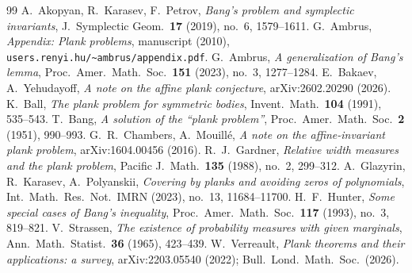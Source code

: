 \documentclass[11pt]{article}
\theoremstyle{plain}
\theoremstyle{remark}
\begin{document}
\begin{thebibliography}{99}
 A.~Akopyan, R.~Karasev, F.~Petrov,
\emph{Bang's problem and symplectic invariants},
J.\ Symplectic Geom.\ \textbf{17} (2019), no.~6, 1579--1611.
 G.~Ambrus, \emph{Appendix: Plank problems}, manuscript (2010),
\texttt{users.renyi.hu/\textasciitilde ambrus/appendix.pdf}.
 G.~Ambrus, \emph{A generalization of Bang's lemma},
Proc.\ Amer.\ Math.\ Soc.\ \textbf{151} (2023), no.~3, 1277--1284.
 E.~Bakaev, A.~Yehudayoff, \emph{A note on the affine plank
conjecture}, arXiv:2602.20290 (2026).
 K.~Ball, \emph{The plank problem for symmetric bodies},
Invent.\ Math.\ \textbf{104} (1991), 535--543.
 T.~Bang, \emph{A solution of the ``plank problem''},
Proc.\ Amer.\ Math.\ Soc.\ \textbf{2} (1951), 990--993.
 G.~R.~Chambers, A.~Mouill\'e, \emph{A note on the
affine-invariant plank problem}, arXiv:1604.00456 (2016).
 R.~J.~Gardner, \emph{Relative width measures and the plank
problem}, Pacific J.\ Math.\ \textbf{135} (1988), no.~2, 299--312.
 A.~Glazyrin, R.~Karasev, A.~Polyanskii, \emph{Covering by planks
and avoiding zeros of polynomials}, Int.\ Math.\ Res.\ Not.\ IMRN (2023),
no.~13, 11684--11700.
 H.~F.~Hunter, \emph{Some special cases of Bang's inequality},
Proc.\ Amer.\ Math.\ Soc.\ \textbf{117} (1993), no.~3, 819--821.
 V.~Strassen, \emph{The existence of probability measures with
given marginals}, Ann.\ Math.\ Statist.\ \textbf{36} (1965), 423--439.
 W.~Verreault, \emph{Plank theorems and their applications:
a survey}, arXiv:2203.05540 (2022); Bull.\ Lond.\ Math.\ Soc.\ (2026).
\end{thebibliography}
\end{document}
